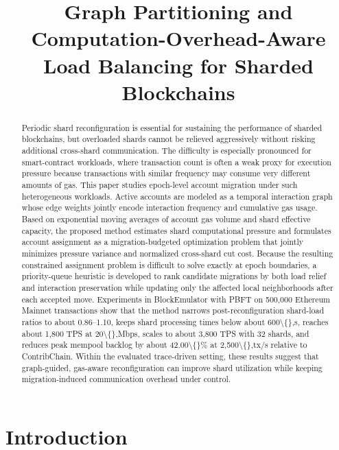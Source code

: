 \documentclass{article}
\title{Graph Partitioning and Computation-Overhead-Aware Load Balancing for Sharded Blockchains}
\date{}
\begin{document}
\maketitle

\begin{abstract}
Periodic shard reconfiguration is essential for sustaining the performance of sharded blockchains, but overloaded shards cannot be relieved aggressively without risking additional cross-shard communication. The difficulty is especially pronounced for smart-contract workloads, where transaction count is often a weak proxy for execution pressure because transactions with similar frequency may consume very different amounts of gas. This paper studies epoch-level account migration under such heterogeneous workloads. Active accounts are modeled as a temporal interaction graph whose edge weights jointly encode interaction frequency and cumulative gas usage. Based on exponential moving averages of account gas volume and shard effective capacity, the proposed method estimates shard computational pressure and formulates account assignment as a migration-budgeted optimization problem that jointly minimizes pressure variance and normalized cross-shard cut cost. Because the resulting constrained assignment problem is difficult to solve exactly at epoch boundaries, a priority-queue heuristic is developed to rank candidate migrations by both load relief and interaction preservation while updating only the affected local neighborhoods after each accepted move. Experiments in BlockEmulator with PBFT on 500,000 Ethereum Mainnet transactions show that the method narrows post-reconfiguration shard-load ratios to about 0.86--1.10, keeps shard processing times below about 600\textbackslash\{\},s, reaches about 1,800 TPS at 20\textbackslash\{\},Mbps, scales to about 3,800 TPS with 32 shards, and reduces peak mempool backlog by about 42.00\textbackslash\{\}\% at 2,500\textbackslash\{\},tx/s relative to ContribChain. Within the evaluated trace-driven setting, these results suggest that graph-guided, gas-aware reconfiguration can improve shard utilization while keeping migration-induced communication overhead under control.
\end{abstract}

\section{Introduction}\label{sec:introduction}
\end{document}
